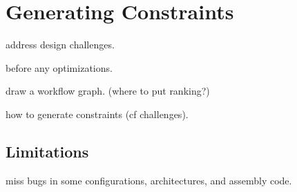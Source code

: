 \section{Generating Constraints}
\label{s:gen}

address design challenges.

before any optimizations.

draw a workflow graph. (where to put ranking?)

how to generate constraints (cf challenges).

\subsection{Limitations}

miss bugs in some configurations, architectures,
and assembly code.
